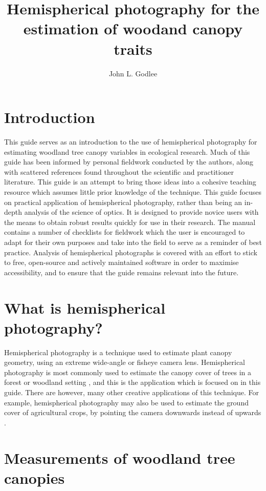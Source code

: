 \documentclass{article}
\title{Hemispherical photography for the estimation of woodand canopy traits}
\date{}
\author{John L. Godlee}
\begin{document}
\maketitle{}
\tableofcontents{}
\newpage{}

\section{Introduction}

This guide serves as an introduction to the use of hemispherical photography for estimating woodland tree canopy variables in ecological research. Much of this guide has been informed by personal fieldwork conducted by the authors, along with scattered references found throughout the scientific and practitioner literature. This guide is an attempt to bring those ideas into a cohesive teaching resource which assumes little prior knowledge of the technique. This guide focuses on practical application of hemispherical photography, rather than being an in-depth analysis of the science of optics. It is designed to provide novice users with the means to obtain robust results quickly for use in their research. The manual contains a number of checklists for fieldwork which the user is encouraged to adapt for their own purposes and take into the field to serve as a reminder of best practice. Analysis of hemispherical photographs is covered with an effort to stick to free, open-source and actively maintained software in order to maximise accessibility, and to ensure that the guide remains relevant into the future.

\section{What is hemispherical photography?}

Hemispherical photography is a technique used to estimate plant canopy geometry, using an extreme wide-angle or fisheye camera lens. Hemispherical photography is most commonly used to estimate the canopy cover of trees in a forest or woodland setting \citep{}, and this is the application which is focused on in this guide. There are however, many other creative applications of this technique. For example, hemispherical photography may also be used to estimate the ground cover of agricultural crops, by pointing the camera downwards instead of upwards \citep{}.

\section{Measurements of woodland tree canopies}
\end{document}
